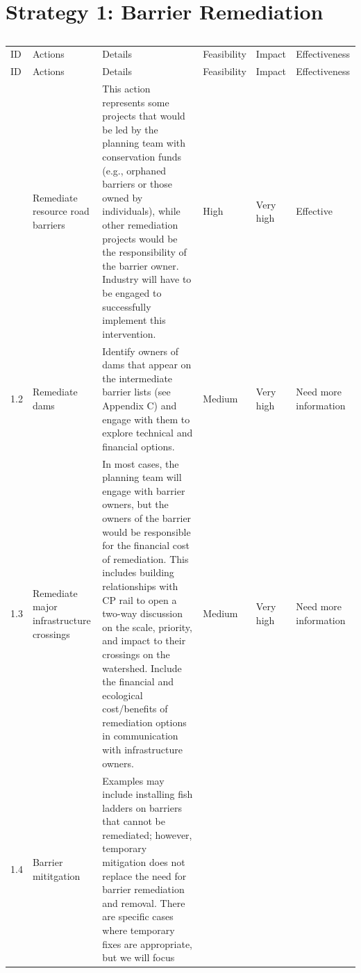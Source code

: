 \documentclass[
  letterpaper,
  DIV=11,
  numbers=noendperiod]{scrreprt}
\begin{document}
\section*{Strategy 1: Barrier
Remediation}\label{strategy-1-barrier-remediation}


\begin{longtable}[]{@{}llllll@{}}

\caption{\label{tbl-S1}Strategy 1}

\tabularnewline

\caption{}\label{T_c6bb7}\tabularnewline
\toprule\noalign{}
ID & Actions & Details & Feasibility & Impact & Effectiveness \\
\midrule\noalign{}
\endfirsthead
\toprule\noalign{}
ID & Actions & Details & Feasibility & Impact & Effectiveness \\
\midrule\noalign{}
\endhead
\bottomrule\noalign{}
\endlastfoot
1.1 & Remediate resource road barriers & This action represents some
projects that would be led by the planning team with conservation funds
(e.g., orphaned barriers or those owned by individuals), while other
remediation projects would be the responsibility of the barrier owner.
Industry will have to be engaged to successfully implement this
intervention. & High & Very high & Effective \\
1.2 & Remediate dams & Identify owners of dams that appear on the
intermediate barrier lists (see Appendix C) and engage with them to
explore technical and financial options. & Medium & Very high & Need
more information \\
1.3 & Remediate major infrastructure crossings & In most cases, the
planning team will engage with barrier owners, but the owners of the
barrier would be responsible for the financial cost of remediation. This
includes building relationships with CP rail to open a two-way
discussion on the scale, priority, and impact to their crossings on the
watershed. Include the financial and ecological cost/benefits of
remediation options in communication with infrastructure owners. &
Medium & Very high & Need more information \\
1.4 & Barrier mititgation & Examples may include installing fish ladders
on barriers that cannot be remediated; however, temporary mitigation
does not replace the need for barrier remediation and removal. There are
specific cases where temporary fixes are appropriate, but we will focus

\end{longtable}
\end{document}
